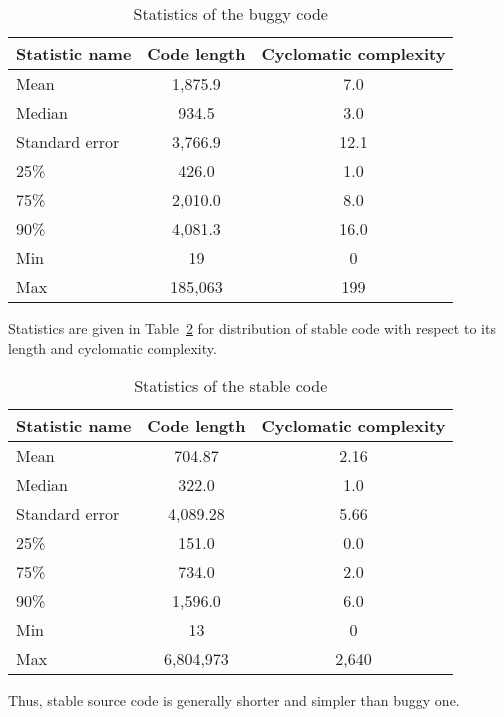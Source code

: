 \documentclass[10pt,conference]{IEEEtran}
\begin{document}
\begin{table}[htbp]
\caption{Statistics of the buggy code}
\begin{center}
\renewcommand{\arraystretch}{1.2}
\begin{tabular}{| l | c | c |}
\hline
  \textbf{Statistic name}  & \textbf{Code length} & \textbf{Cyclomatic complexity}\\
\hline
  Mean & 1,875.9 & 7.0\\
\hline
  Median & 934.5 & 3.0\\
\hline
  Standard error & 3,766.9 & 12.1\\
\hline
  25\% & 426.0 & 1.0\\
\hline
  75\% & 2,010.0 & 8.0\\
\hline
  90\% & 4,081.3 & 16.0\\
\hline
  Min & 19 & 0\\
\hline
  Max &  185,063 & 199 \\
\hline
\end{tabular}
\label{tab4}
\end{center}
\end{table}

Statistics are given in Table~\ref{tab7} for distribution of stable code with respect to its length and cyclomatic complexity.

\begin{table}[htbp]
\caption{Statistics of the stable code}
\begin{center}
\renewcommand{\arraystretch}{1.2}
\begin{tabular}{| l | c | c |}
\hline
  \textbf{Statistic name}  & \textbf{Code length} & \textbf{Cyclomatic complexity} \\
\hline
  Mean & 704.87 & 2.16\\
\hline
  Median & 322.0 & 1.0\\
\hline
  Standard error & 4,089.28 & 5.66 \\
\hline
  25\% & 151.0 & 0.0\\
\hline
  75\% & 734.0 & 2.0\\
\hline
  90\% & 1,596.0 & 6.0 \\
\hline
  Min & 13 & 0\\
\hline
  Max &  6,804,973 & 2,640\\
\hline
\end{tabular}
\label{tab7}
\end{center}
\end{table}

Thus, stable source code is generally shorter and simpler than buggy one.
\end{document}

